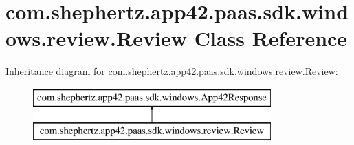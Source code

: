 \hypertarget{classcom_1_1shephertz_1_1app42_1_1paas_1_1sdk_1_1windows_1_1review_1_1_review}{\section{com.\+shephertz.\+app42.\+paas.\+sdk.\+windows.\+review.\+Review Class Reference}
\label{classcom_1_1shephertz_1_1app42_1_1paas_1_1sdk_1_1windows_1_1review_1_1_review}
}
Inheritance diagram for com.\+shephertz.\+app42.\+paas.\+sdk.\+windows.\+review.\+Review\+:\begin{figure}[H]
\begin{center}
\leavevmode
\includegraphics[height=2.000000cm]{classcom_1_1shephertz_1_1app42_1_1paas_1_1sdk_1_1windows_1_1review_1_1_review}
\end{center}
\end{figure}
